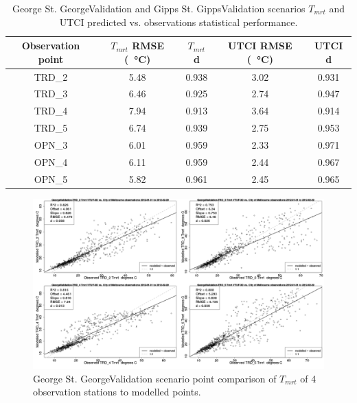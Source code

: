 \documentclass[final,3p,times,authoryear]{elsarticle}
\begin{document}
\begin{center}
\begin{table}[!htbp]
\caption{George St. GeorgeValidation and Gipps St. GippsValidation scenarios $T_{mrt}$ and UTCI predicted vs. observations statistical performance.\label{tab:georgetmrt}}
  \begin{tabular}{  | c |c |c  | c | c | } 
	\hline \textbf{Observation point} & \textbf{$T_{mrt}$ RMSE (\SI{}{\degreeCelsius})} & \textbf{$T_{mrt}$ d} & \textbf{UTCI RMSE (\SI{}{\degreeCelsius})} & \textbf{UTCI d}\\ \hline
TRD\_2  &  5.48   & 0.938  & 3.02  & 0.931   \\ \hline
TRD\_3   & 6.46   & 0.925  & 2.74  & 0.947   \\ \hline
TRD\_4   & 7.94   & 0.913  & 3.64  & 0.914  \\ \hline
TRD\_5   & 6.74   & 0.939  & 2.75  & 0.953   \\ \hline
OPN\_3   & 6.01   & 0.959  & 2.33  & 0.971   \\ \hline
OPN\_4  &  6.11   & 0.959  & 2.44  & 0.967   \\ \hline
OPN\_5   & 5.82   & 0.961  & 2.45  & 0.965  \\ \hline
  \end{tabular} 
\end{table}
\end{center} 

\begin{figure}[!htbp]
\includegraphics[trim = 0mm 0mm 0mm 0mm, clip, scale=0.30]{images/GeorgeValidation-ErrorPlots-Tmrt5.png}
\caption{George St. GeorgeValidation scenario point comparison of $T_{mrt}$ of 4 observation stations to modelled points.\label{fig:GeorgeStTmrtCompare}} 
\end{figure}
\end{document}
